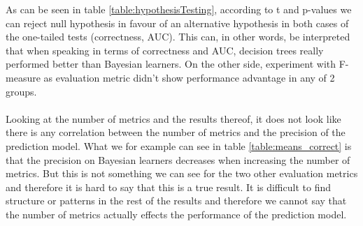 As can be seen in table \ref{table:hypothesisTesting}, according to t and p-values we can reject null hypothesis in favour of an alternative hypothesis in both cases of the one-tailed tests (correctness, AUC). This can, in other words, be interpreted that when speaking in terms of correctness and AUC, decision trees really performed better than Bayesian learners. On the other side, experiment with F-measure as evaluation metric didn't show performance advantage in any of 2 groups.\\\\
Looking at the number of metrics and the results thereof, it does not look like there is any correlation between the number of metrics and the precision of the prediction model. What we for example can see in table \ref{table:means_correct} is that the precision on Bayesian learners decreases when increasing the number of metrics. But this is not something we can see for the two other evaluation metrics and therefore it is hard to say that this is a true result. It is difficult to find structure or patterns in the rest of the results and therefore we cannot say that the number of metrics actually effects the performance of the prediction model. 